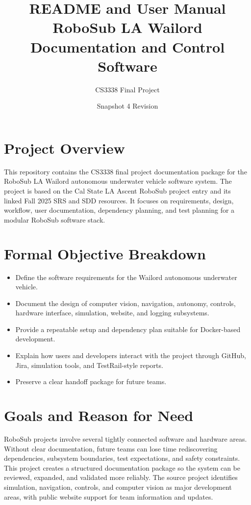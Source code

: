 \documentclass[12pt]{article}
\title{README and User Manual\\RoboSub LA Wailord Documentation and Control Software}
\author{CS3338 Final Project}
\date{Snapshot 4 Revision}
\begin{document}
\maketitle
\tableofcontents
\newpage

\section{Project Overview}
This repository contains the CS3338 final project documentation package for the RoboSub LA Wailord autonomous underwater vehicle software system. The project is based on the Cal State LA Ascent RoboSub project entry and its linked Fall 2025 SRS and SDD resources. It focuses on requirements, design, workflow, user documentation, dependency planning, and test planning for a modular RoboSub software stack.

\section{Formal Objective Breakdown}
\begin{itemize}[leftmargin=*]
  \item Define the software requirements for the Wailord autonomous underwater vehicle.
  \item Document the design of computer vision, navigation, autonomy, controls, hardware interface, simulation, website, and logging subsystems.
  \item Provide a repeatable setup and dependency plan suitable for Docker-based development.
  \item Explain how users and developers interact with the project through GitHub, Jira, simulation tools, and TestRail-style reports.
  \item Preserve a clear handoff package for future teams.
\end{itemize}

\section{Goals and Reason for Need}
RoboSub projects involve several tightly connected software and hardware areas. Without clear documentation, future teams can lose time rediscovering dependencies, subsystem boundaries, test expectations, and safety constraints. This project creates a structured documentation package so the system can be reviewed, expanded, and validated more reliably. The source project identifies simulation, navigation, controls, and computer vision as major development areas, with public website support for team information and updates.
\end{document}
